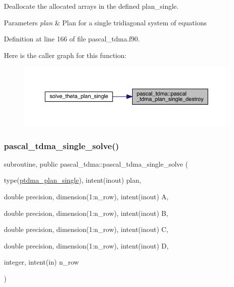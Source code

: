 Deallocate the allocated arrays in the defined plan\+\_\+single. 


\begin{DoxyParams}{Parameters}
{\em plan} & Plan for a single tridiagonal system of equations \\
\hline
\end{DoxyParams}


Definition at line 166 of file pascal\+\_\+tdma.\+f90.

Here is the caller graph for this function\+:
\nopagebreak
\begin{figure}[H]
\begin{center}
\leavevmode
\includegraphics[width=350pt]{namespacepascal__tdma_adb04e59c740ce6c4b9518dd86eaeb594_icgraph}
\end{center}
\end{figure}
\mbox{\label{namespacepascal__tdma_ab14e132231d4b53fd65dd333ccc85a50}} 
\subsubsection{\texorpdfstring{pascal\_tdma\_single\_solve()}{pascal\_tdma\_single\_solve()}}
{\footnotesize\ttfamily subroutine, public pascal\+\_\+tdma\+::pascal\+\_\+tdma\+\_\+single\+\_\+solve (\begin{DoxyParamCaption}\item[{type(\mbox{\hyperlink{structpascal__tdma_1_1ptdma__plan__single}{ptdma\+\_\+plan\+\_\+single}}), intent(inout)}]{plan,  }\item[{double precision, dimension(1\+:n\+\_\+row), intent(inout)}]{A,  }\item[{double precision, dimension(1\+:n\+\_\+row), intent(inout)}]{B,  }\item[{double precision, dimension(1\+:n\+\_\+row), intent(inout)}]{C,  }\item[{double precision, dimension(1\+:n\+\_\+row), intent(inout)}]{D,  }\item[{integer, intent(in)}]{n\+\_\+row }\end{DoxyParamCaption})}



